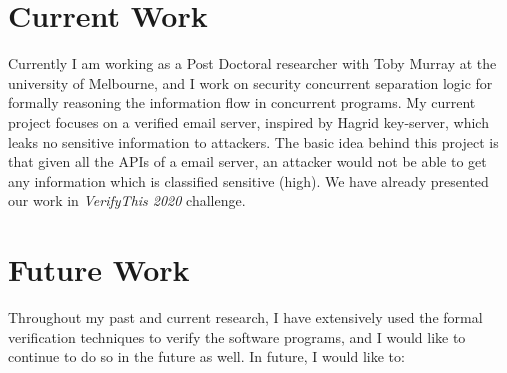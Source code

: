 \documentclass[a4paper]{article}
\begin{document}
\section{Current Work}
Currently I am working as a Post Doctoral researcher with Toby Murray at the university of Melbourne, and I work on 
security concurrent separation logic for formally reasoning the information flow in concurrent programs. My current project 
focuses on a verified email server,  inspired by Hagrid key-server, which leaks no sensitive information to attackers.
The basic idea behind this project is that given all the APIs of a email server, an attacker would not be able to get 
any information which is classified sensitive (high).  We have already presented our work in \textit{VerifyThis 2020} challenge. 


\section{Future Work}
Throughout my past and current research, I have extensively used the formal verification techniques to verify the software programs, 
and I would like to continue to do so in the future as well. In future, I would like to:
\end{document}
